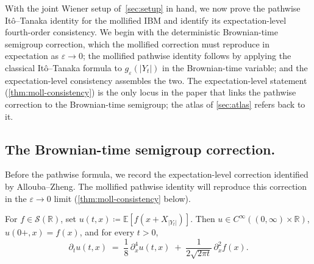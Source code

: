 \documentclass[EJP]{ejpecp}
\newcommand{\R}{\mathbb{R}}
\renewcommand{\E}{\mathbb{E}}
\begin{document}
With the joint Wiener setup of~\cref{sec:setup} in hand, we now
prove the pathwise It\^o--Tanaka identity for the mollified IBM and
identify its expectation-level fourth-order consistency. We begin
with the deterministic Brownian-time semigroup correction, which
the mollified correction must reproduce in expectation as
$\varepsilon\to 0$; the mollified pathwise identity follows by
applying the classical It\^o--Tanaka formula to
$g_\varepsilon(|Y_t|)$ in the Brownian-time variable; and the
expectation-level consistency assembles the two. The
expectation-level statement (\cref{thm:moll-consistency}) is the
only locus in the paper that links the pathwise correction to the
Brownian-time semigroup; the atlas of \cref{sec:atlas} refers back
to it.

\subsection*{The Brownian-time semigroup correction.}

Before the pathwise formula, we record the expectation-level
correction identified by Allouba--Zheng. The mollified pathwise
identity will reproduce this correction in the $\varepsilon\to 0$
limit (\cref{thm:moll-consistency} below).

\begin{theorem}
\label{thm:bt-correction}
For $f\in\mathscr S(\R)$, set $u(t,x)\coloneqq\E[f(x+X_{|Y_t|})]$.
Then $u\in C^{\infty}((0,\infty)\times\R)$, $u(0+,x)=f(x)$, and for
every $t>0$,
\begin{equation}\label{eq:bt-correction}
  \partial_t u(t,x)
  \;=\;\frac{1}{8}\,\partial_x^{4}u(t,x)
       \;+\;\frac{1}{2\sqrt{2\pi t}}\,\partial_x^{2}f(x).
\end{equation}
\end{theorem}
\end{document}
